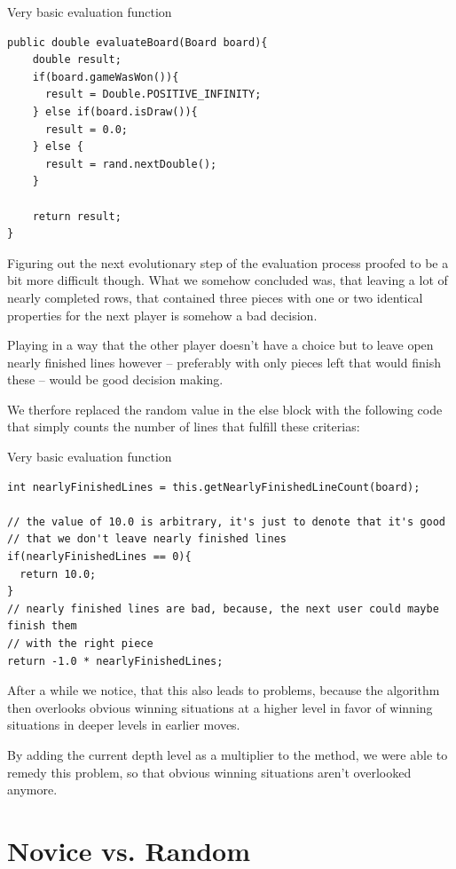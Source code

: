 \documentclass{scrartcl}
\begin{document}
\begin{listing}[H]
\caption{Very basic evaluation function}
\begin{verbatim}
public double evaluateBoard(Board board){
    double result;
    if(board.gameWasWon()){
      result = Double.POSITIVE_INFINITY;
    } else if(board.isDraw()){
      result = 0.0;
    } else {
      result = rand.nextDouble();
    }

    return result;
}
\end{verbatim}
\end{listing}

Figuring out the next evolutionary step of the evaluation process proofed to be a bit more difficult though. What we somehow concluded was, that leaving a lot of nearly completed rows, that contained three pieces with one or two identical properties for the next player is somehow a bad decision.

Playing in a way that the other player doesn't have a choice but to leave open nearly finished lines however -- preferably with only pieces left that would finish these -- would be good decision making.

We therfore replaced the random value in the else block with the following code that simply counts the number of lines that fulfill these criterias:

\begin{listing}[H]
\caption{Very basic evaluation function}
\begin{verbatim}
int nearlyFinishedLines = this.getNearlyFinishedLineCount(board);

// the value of 10.0 is arbitrary, it's just to denote that it's good 
// that we don't leave nearly finished lines
if(nearlyFinishedLines == 0){
  return 10.0;
}
// nearly finished lines are bad, because, the next user could maybe finish them 
// with the right piece
return -1.0 * nearlyFinishedLines;
\end{verbatim}
\end{listing}

After a while we notice, that this also leads to problems, because the algorithm then overlooks obvious winning situations at a higher level in favor of winning situations in deeper levels in earlier moves.

By adding the current depth level as a multiplier to the method, we were able to remedy this problem, so that obvious winning situations aren't overlooked anymore.


\section{Novice vs. Random}
\end{document}
